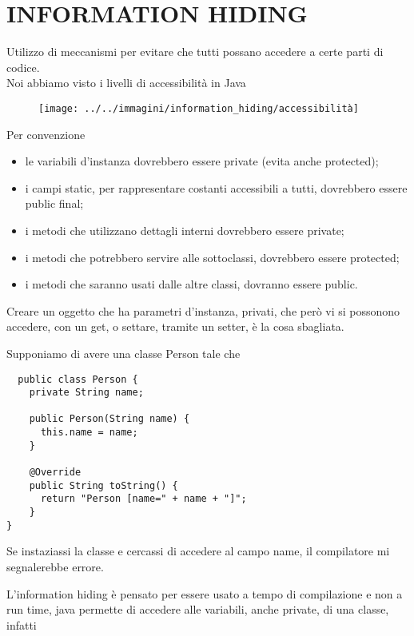 \chapter{INFORMATION HIDING}

Utilizzo di meccanismi per evitare che tutti possano accedere a certe parti di codice.\\
Noi abbiamo visto i livelli di accessibilità in Java

\begin{figure}[H]
  \centering
  \texttt{[image: ../../immagini/information\_hiding/accessibilità]}
\end{figure}

Per convenzione

\begin{itemize}
  \item le variabili d'instanza dovrebbero essere private (evita anche protected);
  \item i campi static, per rappresentare costanti accessibili a tutti, dovrebbero essere public final;
  \item i metodi che utilizzano dettagli interni dovrebbero essere private;
  \item i metodi che potrebbero servire alle sottoclassi, dovrebbero essere protected;
  \item i metodi che saranno usati dalle altre classi, dovranno essere public.
\end{itemize}

Creare un oggetto che ha parametri d'instanza, privati, che però vi si possonono accedere, con un get, o settare, tramite un setter, è la cosa sbagliata.

Supponiamo di avere una classe Person tale che

\begin{lstlisting}
  public class Person {
    private String name;
    
    public Person(String name) {
      this.name = name;
    }
    
    @Override
    public String toString() {
      return "Person [name=" + name + "]";
    }
}
\end{lstlisting}

Se instaziassi la classe e cercassi di accedere al campo name, il compilatore mi segnalerebbe errore.

L'information hiding è pensato per essere usato a tempo di compilazione e non a run time, java permette di accedere alle variabili, anche private, di una classe, 
infatti

